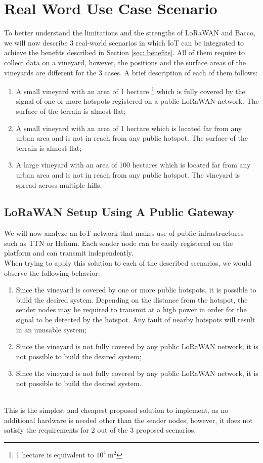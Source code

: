 \section{Real Word Use Case Scenario}
To better understand the limitations and the strengths of LoRaWAN and Bacco, we will now describe 3 real-world scenarios
in which \gls{IoT} can be integrated to achieve the benefits described in Section \ref{sec: benefits}. All of them
require to collect data on a vineyard, however, the positions and the surface areas of the vineyards are
different for the 3 cases. A brief description of each of them follows:
\begin{enumerate}
    \item A small vineyard with an area of 1 hectare \footnote{1 hectare is equivalent to $10^4~\mathrm{m^2}$} which is
        fully covered by the signal of one or more hotspots registered on a public LoRaWAN
        network. The surface of the terrain is almost flat;
    \item A small vineyard with an area of 1 hectare which is located far from any urban area and is not
        in reach from any public hotspot. The surface of the terrain is almost flat;
    \item A large vineyard with an area of 100 hectares which is located far from any urban area and is not in reach
        from any public hotspot. The vineyard is spread across multiple hills.
\end{enumerate}

\subsection{LoRaWAN Setup Using A Public Gateway}
We will now analyze an \gls{IoT} network that makes use of public infrastructures such as
\gls{TTN} or Helium. Each sender node can be easily registered on the platform and can transmit independently.\\
When trying to apply this solution to each of the described scenarios, we would observe the following behavior:
\begin{enumerate}
    \item Since the vineyard is covered by one or more public hotspots, it is possible to build the desired system.
        Depending on the distance from the hotspot, the sender nodes may be required to transmit at a high power in
        order for the signal to be detected by the hotspot. Any fault of nearby hotspots will result in an unusable
        system;
    \item Since the vineyard is not fully covered by any public LoRaWAN network, it is not possible to build the desired
        system;
    \item Since the vineyard is not fully covered by any public LoRaWAN network, it is not possible to build the desired
        system.
\end{enumerate}
\\
This is the simplest and cheapest proposed solution to implement, as no additional hardware is needed other than the
sender nodes, however, it does not satisfy the requirements for 2 out of the 3 proposed scenarios.

